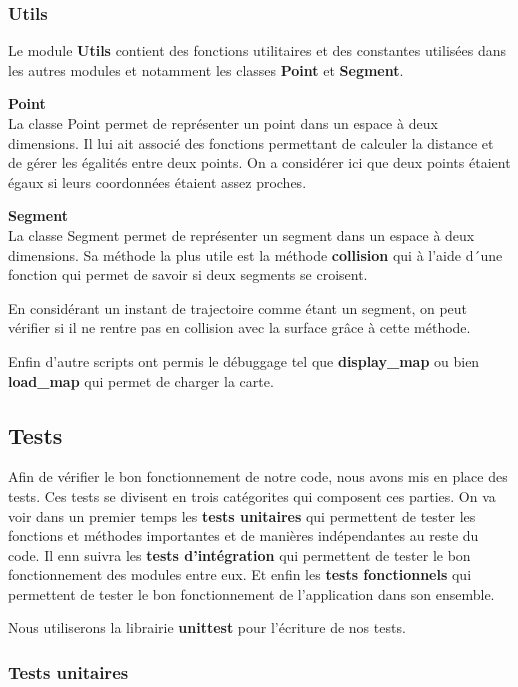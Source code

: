 \documentclass[french,a4paper,10pt,twocolumn]{article}
\begin{document}
\subsubsection{Utils}

Le module \textbf{Utils} contient des fonctions utilitaires et des constantes utilisées dans les autres modules et notamment les classes
\textbf{Point} et \textbf{Segment}.

\textbf{Point}\\
La classe Point permet de représenter un point dans un espace à deux dimensions. Il lui ait associé des fonctions permettant de calculer la distance et de gérer
les égalités entre deux points. 
On a considérer ici que deux points étaient égaux si leurs coordonnées étaient assez proches.

\textbf{Segment}\\
La classe Segment permet de représenter un segment dans un espace à deux dimensions.
Sa méthode la plus utile est la méthode \textbf{collision} qui à l'aide d´une fonction \cite[\textbf{CCW}]{ccw_intersect_detection} qui permet de savoir si deux segments se croisent.

En considérant un instant de trajectoire comme étant un segment, on peut vérifier si il ne rentre pas en collision avec la surface grâce à cette méthode.

Enfin d'autre scripts ont permis le débuggage tel que \textbf{display\_map} ou bien \textbf{load\_map} qui permet de charger la carte.
\subsection{Tests}

Afin de vérifier le bon fonctionnement de notre code, nous avons mis en place des tests.
Ces tests se divisent en trois catégorites qui composent ces parties.
On va voir dans un premier temps les \textbf{tests unitaires} qui permettent de tester les fonctions et méthodes importantes et de manières indépendantes
au reste du code.
Il enn suivra les \textbf{tests d'intégration} qui permettent de tester le bon fonctionnement des modules entre eux.
Et enfin les \textbf{tests fonctionnels} qui permettent de tester le bon fonctionnement de l'application dans son ensemble.

Nous utiliserons la librairie \textbf{unittest} pour l'écriture de nos tests.

\subsubsection{Tests unitaires}
\end{document}
